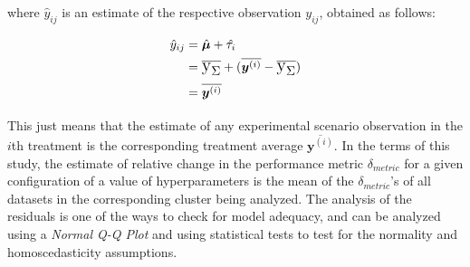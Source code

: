 \noindent where $\hat{y}_{ij}$ is an estimate of the respective observation $y_{ij}$, obtained as follows:

\begin{equation}    
    \begin{split}
        \hat{y}_{ij} & = \hat{\bm{\mu}} + \hat{\tau_i}\\
        & = \text{\Large$\overline{\text{\textup{y}}_\Sigma}$} + (\overline{\bm{y}^{(i)}} - \text{\Large$\overline{\text{\textup{y}}_\Sigma}$})\\
        & = \overline{\bm{y}^{(i)}}
    \end{split}
\end{equation}

\noindent This just means that the estimate of any experimental scenario observation in the $i$th treatment is the corresponding treatment average $\overline{\bm{y}^{(i)}}$. In the terms of this study, the estimate of relative change in the performance metric $\delta_{metric}$ for a given configuration of a value of hyperparameters is the mean of the $\delta_{metric}$'s of all datasets in the corresponding cluster being analyzed. The analysis of the residuals is one of the ways to check for model adequacy, and can be analyzed using a \textit{Normal Q-Q Plot} and using statistical tests to test for the normality and homoscedasticity assumptions.

